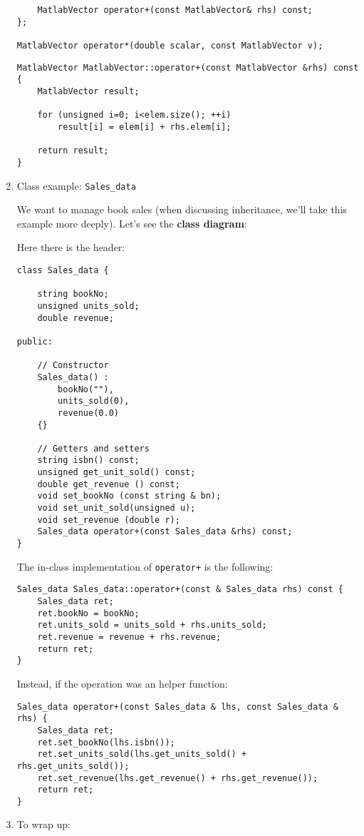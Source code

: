 \begin{enumerate}[$\triangleright$]
\begin{lstlisting}
    MatlabVector operator+(const MatlabVector& rhs) const;
};

MatlabVector operator*(double scalar, const MatlabVector v);
\end{lstlisting}
\begin{lstlisting}
MatlabVector MatlabVector::operator+(const MatlabVector &rhs) const
{
    MatlabVector result;

    for (unsigned i=0; i<elem.size(); ++i)
        result[i] = elem[i] + rhs.elem[i];

    return result;
}
\end{lstlisting}

\item Class example: \texttt{Sales\_data}

We want to manage book sales (when discussing inheritance, we'll take this example more deeply). Let's see the \textbf{class diagram}:

Here there is the header:
\begin{lstlisting}
class Sales_data { 
    
    string bookNo; 
    unsigned units_sold; 
    double revenue;

public: 

    // Constructor
    Sales_data() : 
        bookNo(""), 
        units_sold(0), 
        revenue(0.0) 
    {}

    // Getters and setters
    string isbn() const;
    unsigned get_unit_sold() const; 
    double get_revenue () const;
    void set_bookNo (const string & bn); 
    void set_unit_sold(unsigned u); 
    void set_revenue (double r);
    Sales_data operator+(const Sales_data &rhs) const;
}
\end{lstlisting}

The in-class implementation of \texttt{operator+} is the following:
\begin{lstlisting}
Sales_data Sales_data::operator+(const & Sales_data rhs) const {
    Sales_data ret;
    ret.bookNo = bookNo;
    ret.units_sold = units_sold + rhs.units_sold; 
    ret.revenue = revenue + rhs.revenue;
    return ret;
}
\end{lstlisting}

Instead, if the operation was an helper function:
\begin{lstlisting}
Sales_data operator+(const Sales_data & lhs, const Sales_data & rhs) {
    Sales_data ret; 
    ret.set_bookNo(lhs.isbn()); 
    ret.set_units_sold(lhs.get_units_sold() + rhs.get_units_sold()); 
    ret.set_revenue(lhs.get_revenue() + rhs.get_revenue());
    return ret; 
}
\end{lstlisting}

\item To wrap up:
\end{enumerate}

